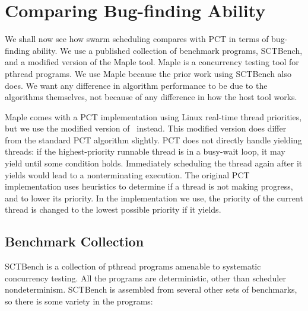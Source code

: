 \section{Comparing Bug-finding Ability}
\label{sec:algorithms-eval}

We shall now see how swarm scheduling compares with PCT in terms of bug-finding
ability.  We use a published collection of benchmark programs,
SCTBench\cite{thomson2016,thomson2014}, and a modified version of the Maple
tool\cite{yu2012}.  Maple is a concurrency testing tool for pthread programs.
We use Maple because the prior work using SCTBench also does.  We want any
difference in algorithm performance to be due to the algorithms themselves, not
because of any difference in how the host tool works.

Maple comes with a PCT implementation using Linux real-time thread priorities,
but we use the modified version of~\cite{thomson2016} instead.  This modified
version does differ from the standard PCT algorithm slightly.  PCT does not
directly handle yielding threads: if the highest-priority runnable thread is in
a busy-wait loop, it may yield until some condition holds.  Immediately
scheduling the thread again after it yields would lead to a nonterminating
execution.  The original PCT implementation uses heuristics to determine if a
thread is not making progress, and to lower its priority\cite{burckhardt2010}.
In the implementation we use, the priority of the current thread is changed to
the lowest possible priority if it yields\cite{thomson2016}.

\subsection{Benchmark Collection}
\label{sec:algorithms-eval-sctbench}

SCTBench\cite{thomson2016,thomson2014} is a collection of pthread programs
amenable to systematic concurrency testing.  All the programs are deterministic,
other than scheduler nondeterminism.  SCTBench is assembled from several other
sets of benchmarks, so there is some variety in the programs:

